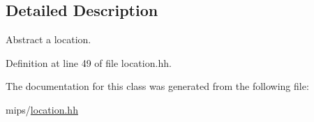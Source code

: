 \subsection{Detailed Description}
Abstract a location. 

Definition at line 49 of file location.\-hh.



The documentation for this class was generated from the following file\-:\begin{DoxyCompactItemize}
\item 
mips/\hyperlink{location_8hh}{location.\-hh}\end{DoxyCompactItemize}
